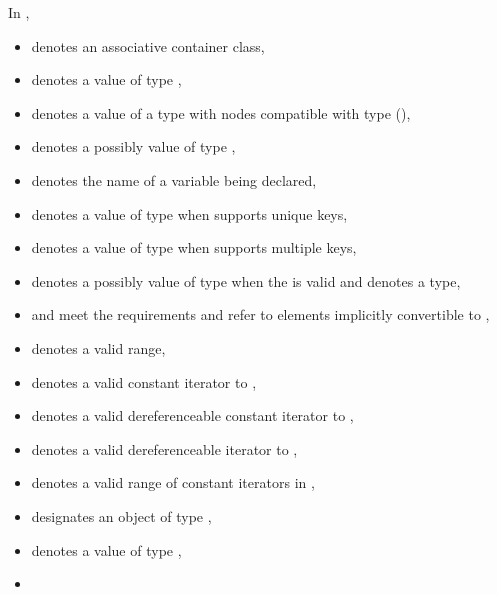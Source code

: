 \documentclass{wg21}
\begin{document}
\pnum
In ,
\begin{itemize}
    \item
     denotes an associative container class,
    \item
     denotes a value of type ,
    \item
     denotes a value of a type with nodes compatible with type
     (),
    \item
     denotes a possibly  value of type ,
    \item
     denotes the name of a variable being declared,
    \item
     denotes a value of type 
    when  supports unique keys,
    \item
     denotes a value of type 
    when  supports multiple keys,
    \item
     denotes a possibly  value of type 
    when the 
     is valid
    and denotes a type,
    \item
     and 
    meet the  requirements and refer to elements
    implicitly convertible to
    ,
    \item
     denotes a valid range,
    \item
     denotes a valid constant iterator to ,
    \item
     denotes a valid dereferenceable constant iterator to ,
    \item
     denotes a valid dereferenceable iterator to ,
    \item
    \tcode{[q1, q2)} denotes a valid range of constant iterators in ,
    \item
     designates an object of type ,
    \item
     denotes a value of type ,
    \item

\end{itemize}
\end{document}
